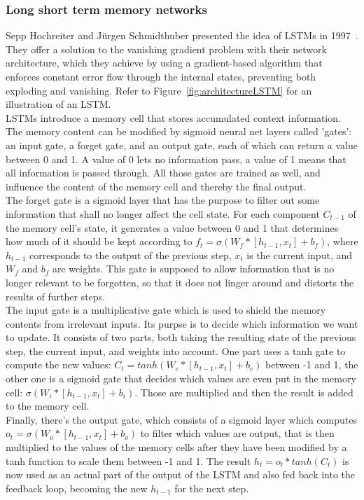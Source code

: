 \documentclass[
a4paper,
pagesize,
pdftex,
12pt,
twoside, %
BCOR=5mm, %
ngerman,
fleqn,
final,
]{scrartcl}
\begin{document}
	\subsubsection{Long short term memory networks}\label{LSTM}
	Sepp Hochreiter and Jürgen Schmidthuber presented the idea of LSTMs in 1997~\cite{Hochreiter.1997}. They offer a solution to the vanishing gradient problem with their network architecture, which they achieve by using a gradient-based algorithm that enforces constant error flow through the internal states, preventing both exploding and vanishing. Refer to Figure~\ref{fig:architectureLSTM} for an illustration of an LSTM.\\
	LSTMs introduce a memory cell that stores accumulated context information. The memory content can be modified by sigmoid neural net layers called 'gates': an input gate, a forget gate, and an output gate, each of which can return a value between 0 and 1. A value of 0 lets no information pass, a value of 1 means that all information is passed through. All those gates are trained as well, and influence the content of the memory cell and thereby the final output.\\
	The forget gate is a sigmoid layer that has the purpose to filter out some information that shall no longer affect the cell state. For each component $C_{t-1}$ of the memory cell's state, it generates a value between 0 and 1 that determines how much of it should be kept according to $f_t = \sigma (W_f * [h_{t-1}, x_t] + b_f)$, where $h_{t-1}$ corresponds to the output of the previous step, $x_t$ is the current input, and $W_f$ and $b_f$ are weights. This gate is supposed to allow information that is no longer relevant to be forgotten, so that it does not linger around and distorts the results of further steps.\\
	The input gate is a multiplicative gate which is used to shield the memory contents from irrelevant inputs. Its purpse is to decide which information we want to update. It consists of two parts, both taking the resulting state of the previous step, the current input, and weights into account. One part uses a tanh gate to compute the new values: $C_t = tanh (W_c * [h_{t-1} , x_t] + b_c)$ between -1 and 1, the other one is a sigmoid gate that decides which values are even put in the memory cell: $\sigma (W_i * [h_{t-1}, x_t] + b_i)$. Those are multiplied and then the result is added to the memory cell.\\
	Finally, there's the output gate, which consists of a sigmoid layer which computes $o_t = \sigma (W_o * [h_{t-1}, x_t] + b_o)$ to filter which values are output, that is then multiplied to the values of the memory cells after they have been modified by a tanh function to scale them between -1 and 1. The result $h_t = o_t * tanh(C_t)$ is now used as an actual part of the output of the LSTM and also fed back into the feedback loop, becoming the new $h_{t-1}$ for the next step.	
	
\end{document}
